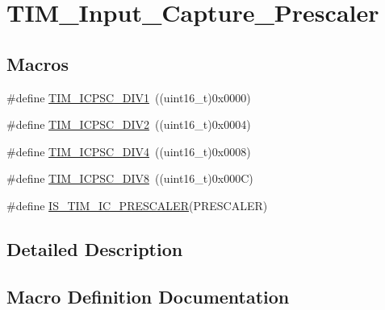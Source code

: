 \hypertarget{group___t_i_m___input___capture___prescaler}{}\section{T\+I\+M\+\_\+\+Input\+\_\+\+Capture\+\_\+\+Prescaler}
\label{group___t_i_m___input___capture___prescaler}
\subsection*{Macros}
\begin{DoxyCompactItemize}
\item 
\#define \mbox{\hyperlink{group___t_i_m___input___capture___prescaler_ga8acb44abe3147d883685c1f9f1ce410e}{T\+I\+M\+\_\+\+I\+C\+P\+S\+C\+\_\+\+D\+I\+V1}}~((uint16\+\_\+t)0x0000)
\item 
\#define \mbox{\hyperlink{group___t_i_m___input___capture___prescaler_ga1d8a7b66add914e2ddd910d2d700978f}{T\+I\+M\+\_\+\+I\+C\+P\+S\+C\+\_\+\+D\+I\+V2}}~((uint16\+\_\+t)0x0004)
\item 
\#define \mbox{\hyperlink{group___t_i_m___input___capture___prescaler_gaf5a675046430fa0f0c95b0dac612828f}{T\+I\+M\+\_\+\+I\+C\+P\+S\+C\+\_\+\+D\+I\+V4}}~((uint16\+\_\+t)0x0008)
\item 
\#define \mbox{\hyperlink{group___t_i_m___input___capture___prescaler_ga5086cb03c89a5c67b199d20b605f00cb}{T\+I\+M\+\_\+\+I\+C\+P\+S\+C\+\_\+\+D\+I\+V8}}~((uint16\+\_\+t)0x000\+C)
\item 
\#define \mbox{\hyperlink{group___t_i_m___input___capture___prescaler_ga91d219d7a210eb0a4bb49d72bda6b321}{I\+S\+\_\+\+T\+I\+M\+\_\+\+I\+C\+\_\+\+P\+R\+E\+S\+C\+A\+L\+ER}}(P\+R\+E\+S\+C\+A\+L\+ER)
\end{DoxyCompactItemize}


\subsection{Detailed Description}


\subsection{Macro Definition Documentation}
\mbox{\label{group___t_i_m___input___capture___prescaler_ga91d219d7a210eb0a4bb49d72bda6b321}} 
